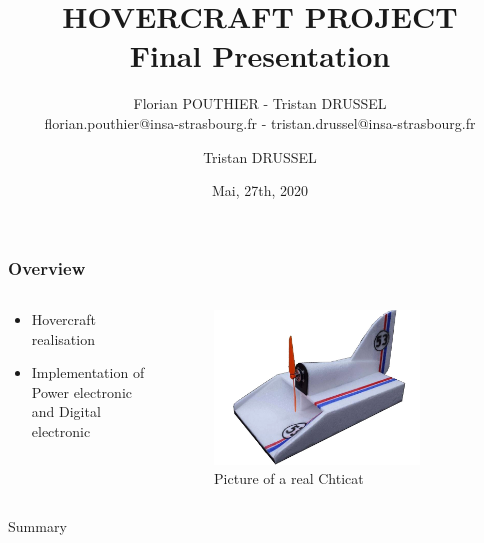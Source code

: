 \documentclass{beamer}
\title[Final Presentation]{HOVERCRAFT PROJECT\\Final Presentation}
\author[]{Florian POUTHIER - Tristan DRUSSEL\\ \tiny florian.pouthier@insa-strasbourg.fr - tristan.drussel@insa-strasbourg.fr}
\date{Mai, 27th, 2020}
\institute{4th Year Electrical Engeenering \\ INSA Strasbourg}
\begin{document}
	\begin{frame}
		\titlepage
	\end{frame}
	\author[]{Tristan DRUSSEL}
	\begin{frame}
		\frametitle{Overview}
		\begin{columns}[T]
	  		\begin{column}{0.5\textwidth}
	  		\begin{itemize}
	  			\item Hovercraft realisation
				\item Implementation of Power electronic and Digital electronic
	  		\end{itemize}
	  		\end{column}
	  		\begin{column}{0.5\textwidth}
	  			\begin{figure}
	    			\includegraphics[width=0.8\textwidth]{../Illus/Chticat.png}
	    			\caption{Picture of a real Chticat}
	    		 \end{figure}
	  		\end{column}
		\end{columns}
	\end{frame}
	\begin{frame}{Summary}
		\setcounter{tocdepth}{1}
		\tableofcontents
	\end{frame}
\end{document}
